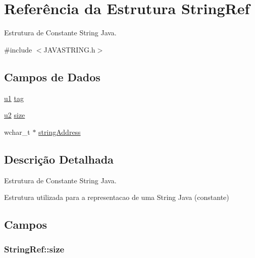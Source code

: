 \hypertarget{struct_string_ref}{}\section{Referência da Estrutura String\+Ref}
\label{struct_string_ref}


Estrutura de Constante String Java.  




{\ttfamily \#include $<$J\+A\+V\+A\+S\+T\+R\+I\+N\+G.\+h$>$}

\subsection*{Campos de Dados}
\begin{DoxyCompactItemize}
\item 
\hyperlink{_e___j_v_m_8h_a216a9f8b04b4f0af84a4ca9d1d85a6ca}{u1} \hyperlink{struct_string_ref_a4d039a824a7ac849742acb2cbbfce77d}{tag}
\item 
\hyperlink{_e___j_v_m_8h_a5f223212eef04d10a4550ded680cb1cf}{u2} \hyperlink{struct_string_ref_ac00b58f387df69e78c10e4152332261f}{size}
\item 
wchar\+\_\+t $\ast$ \hyperlink{struct_string_ref_ae38ec52f1790f3c3cfb82c0ebcf72d2d}{string\+Address}
\end{DoxyCompactItemize}


\subsection{Descrição Detalhada}
Estrutura de Constante String Java. 

Estrutura utilizada para a representacao de uma String Java (constante) 

\subsection{Campos}
\hypertarget{struct_string_ref_ac00b58f387df69e78c10e4152332261f}{}
\subsubsection[{size}]{ String\+Ref\+::size}\label{struct_string_ref_ac00b58f387df69e78c10e4152332261f}
\hypertarget{struct_string_ref_ae38ec52f1790f3c3cfb82c0ebcf72d2d}{}
